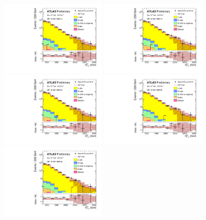 \begin{figure}[tbph]
\begin{center}
\includegraphics[width=0.45\textwidth]{figures/ATLAS-CONF-2016-078_INT/N-1Plots/AtlasStyle/Preliminary/CRY_SRJigsawSRG1a_LastCut_CRY_minusone}
\includegraphics[width=0.45\textwidth]{figures/ATLAS-CONF-2016-078_INT/N-1Plots/AtlasStyle/Preliminary/CRY_SRJigsawSRG1b_LastCut_CRY_minusone}
\includegraphics[width=0.45\textwidth]{figures/ATLAS-CONF-2016-078_INT/N-1Plots/AtlasStyle/Preliminary/CRY_SRJigsawSRG2a_LastCut_CRY_minusone}
\includegraphics[width=0.45\textwidth]{figures/ATLAS-CONF-2016-078_INT/N-1Plots/AtlasStyle/Preliminary/CRY_SRJigsawSRG2b_LastCut_CRY_minusone}
\includegraphics[width=0.45\textwidth]{figures/ATLAS-CONF-2016-078_INT/N-1Plots/AtlasStyle/Preliminary/CRY_SRJigsawSRG3a_LastCut_CRY_minusone}

\end{center}
\end{figure}
